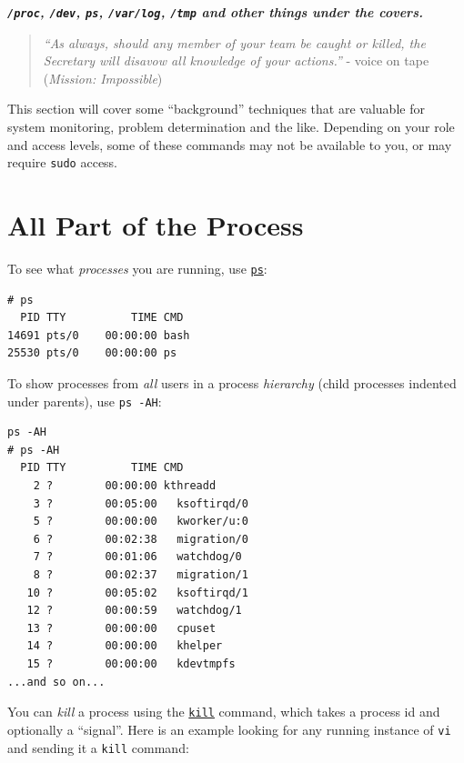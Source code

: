 \documentclass[10pt,]{book}
\numberwithin{figure}{chapter}
\begin{document}

\textbf{\emph{\texttt{/proc}, \texttt{/dev}, \texttt{ps},
\texttt{/var/log}, \texttt{/tmp} and other things under the covers.}}

\begin{quote}
\emph{``As always, should any member of your team be caught or killed,
the Secretary will disavow all knowledge of your actions.''} - voice on
tape (\emph{Mission: Impossible})
\end{quote}

This section will cover some ``background'' techniques that are valuable
for system monitoring, problem determination and the like. Depending on
your role and access levels, some of these commands may not be available
to you, or may require \texttt{sudo} access.

\section{All Part of the Process}\label{all-part-of-the-process}

To see what \emph{processes} you are running, use
\href{http://linux.die.net/man/1/ps}{\texttt{ps}}:

\begin{verbatim}
# ps
  PID TTY          TIME CMD
14691 pts/0    00:00:00 bash
25530 pts/0    00:00:00 ps
\end{verbatim}

To show processes from \emph{all} users in a process \emph{hierarchy}
(child processes indented under parents), use \texttt{ps -AH}:

\begin{verbatim}
ps -AH
# ps -AH
  PID TTY          TIME CMD
    2 ?        00:00:00 kthreadd
    3 ?        00:05:00   ksoftirqd/0
    5 ?        00:00:00   kworker/u:0
    6 ?        00:02:38   migration/0
    7 ?        00:01:06   watchdog/0
    8 ?        00:02:37   migration/1
   10 ?        00:05:02   ksoftirqd/1
   12 ?        00:00:59   watchdog/1
   13 ?        00:00:00   cpuset
   14 ?        00:00:00   khelper
   15 ?        00:00:00   kdevtmpfs
...and so on...
\end{verbatim}

You can \emph{kill} a process using the
\href{http://linux.die.net/man/1/kill}{\texttt{kill}} command, which
takes a process id and optionally a ``signal''. Here is an example
looking for any running instance of \texttt{vi} and sending it a
\texttt{kill} command:
\end{document}
